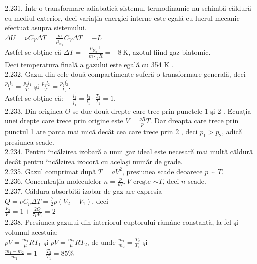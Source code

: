 2.231. Într-o transformare adiabatică sistemul termodinamic nu schimbă căldură cu mediul exterior, deci variația energiei interne este egală cu lucrul mecanic efectuat asupra sistemului.\\ $\Delta U=\nu C_{V} \Delta T=\frac{m}{\mu_{\mathrm{N}_{2}}} C_{V} \Delta T=-L$\\ Astfel se obţine că $\Delta T=-\frac{\mu_{\mathrm{N}_{2}} \mathrm{~L}}{m \cdot \frac{5}{2} R}=-8 \mathrm{~K}$, azotul fiind gaz biatomic.\\ Deci temperatura finală a gazului este egală cu 354 K .\\

2.232. Gazul din cele două compartimente suferă o transformare generală, deci\\ $\frac{p_{1} l_{1}}{T}=\frac{p_{2} l_{1}^{\prime}}{T_{1}}$ și $\frac{p_{1} l_{2}}{T}=\frac{p_{2} l_{2}^{\prime}}{T_{2}}$.\\ Astfel se obţine că: $\quad \frac{l_{2}^{\prime}}{l_{1}^{\prime}}=\frac{l_{2}}{l_{1}} \cdot \frac{T_{2}}{T_{1}}=1$.\\

2.233. Din originea $O$ se duc două drepte care trec prin punctele 1 şi 2 . Ecuația unei drepte care trece prin origine este $V=\frac{\nu R}{p} T$. Dar dreapta care trece prin punctul 1 are panta mai mică decât cea care trece prin 2 , deci $p_{1}>p_{2}$, adică presiunea scade.\\

2.234. Pentru încălzirea izobară a unui gaz ideal este necesară mai multă căldură decât pentru încălzirea izocoră cu acelaşi număr de grade.\\

2.235. Gazul comprimat după $T=a V^{2}$, presiunea scade deoarece $p \sim T$.\\

2.236. Concentrația moleculelor $n=\frac{p}{k T}, V$ creşte $\sim T$, deci $n$ scade.\\

2.237. Căldura absorbită izobar de gaz are expresia\\ $Q=\nu C_{p} \Delta T=\frac{7}{2} p\left(V_{2}-V_{1}\right)$, deci \\ $\frac{V_{2}}{V_{1}}=1+\frac{2 Q}{7 p V_{1}}=2$\\

2.238. Presiunea gazului din interiorul cuptorului rămâne constantă, la fel şi volumul acestuia:\\ $p V=\frac{m_{1}}{\mu} R T_{1}$ şi $p V=\frac{m_{2}}{\mu} R T_{2}$, de unde $\frac{m_{1}}{m_{2}}=\frac{T_{2}}{T_{1}}$ şi\\ $\frac{m_{1}-m_{2}}{m_{1}}=1-\frac{T_{2}}{T_{1}}=85 \%$\\

